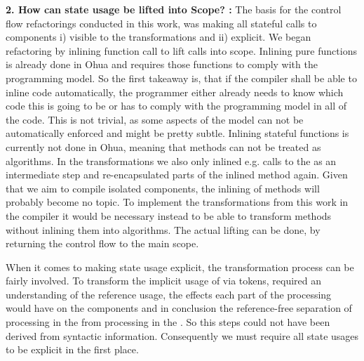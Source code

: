 \textbf{2. How can state usage be lifted into Scope? :} The basis for the control flow refactorings conducted in this work, was making all stateful calls to components i) visible to the transformations and ii) explicit. We began refactoring by inlining function call to lift \dev{} calls into scope. Inlining pure functions is already done in Ohua and requires those functions to comply with the programming model. So the first takeaway is, that if the compiler shall be able to inline code automatically, the programmer either already needs to know which code this is going to be or has to comply with the programming model in all of the code. This is not trivial, as some aspects of the model can not be automatically enforced and might be pretty subtle. Inlining stateful functions is currently not done in Ohua, meaning that methods can not be treated as algorithms. In the transformations we also only inlined e.g. calls to the  as an intermediate step and re-encapsulated parts of the inlined method again. Given that we aim to compile isolated components, the inlining of methods will probably become no topic. To implement the transformations from this work in the compiler it would be necessary instead to be able to transform methods without inlining them into algorithms. The actual lifting can be done, by returning the control flow to the main scope.

When it comes to making state usage explicit, the transformation process can be fairly involved. To transform the implicit usage of \dev{} via tokens, required an understanding of the reference usage, the effects each part of the processing would have on the components and in conclusion the reference-free separation of processing in the \stack{} from processing in the \dev{}. So this steps could not have been derived from syntactic information. Consequently we must require all state usages to be explicit in the first place.


